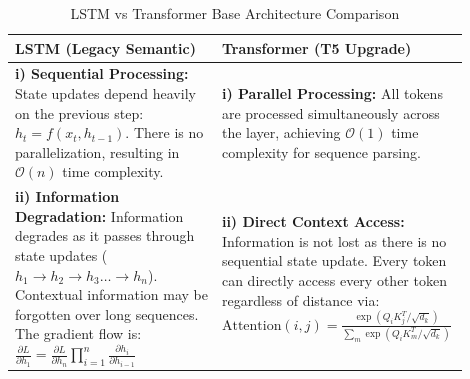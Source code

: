 \documentclass[twocolumn]{article}
\begin{document}
\begin{table}[t]
\centering
\begin{minipage}[t]{0.48\textwidth}
\centering
\caption{LSTM vs Transformer Base Architecture Comparison}
\label{tab:lstm_vs_transformer}
\renewcommand{\arraystretch}{1.5}
\begin{tabular}{p{0.45\linewidth} p{0.45\linewidth}}
\toprule
\textbf{LSTM (Legacy Semantic)} & \textbf{Transformer (T5 Upgrade)} \\
\midrule
\textbf{i) Sequential Processing:} State updates depend heavily on the previous step: $h_t = f(x_t, h_{t-1})$. There is no parallelization, resulting in $\mathcal{O}(n)$ time complexity. & \textbf{i) Parallel Processing:} All tokens are processed simultaneously across the layer, achieving $\mathcal{O}(1)$ time complexity for sequence parsing. \\

\textbf{ii) Information Degradation:} Information degrades as it passes through state updates ($h_1 \rightarrow h_2 \rightarrow h_3 \dots \rightarrow h_n$). Contextual information may be forgotten over long sequences. The gradient flow is: 
$\frac{\partial L}{\partial h_1} = \frac{\partial L}{\partial h_n} \prod_{i=1}^n \frac{\partial h_i}{\partial h_{i-1}}$ & \textbf{ii) Direct Context Access:} Information is not lost as there is no sequential state update. Every token can directly access every other token regardless of distance via:
$\text{Attention}(i,j) = \frac{\exp(Q_i K_j^T / \sqrt{d_k})}{\sum_m \exp(Q_i K_m^T / \sqrt{d_k})}$ \\


\end{tabular}
\end{minipage}
\end{table}
\end{document}
